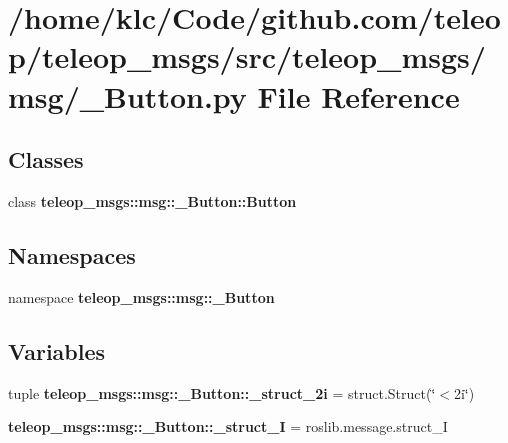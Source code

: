 \section{/home/klc/Code/github.com/teleop/teleop\_\-msgs/src/teleop\_\-msgs/msg/\_\-Button.py File Reference}
\label{__Button_8py}
\subsection*{Classes}
\begin{DoxyCompactItemize}
\item 
class {\bf teleop\_\-msgs::msg::\_\-Button::Button}
\end{DoxyCompactItemize}
\subsection*{Namespaces}
\begin{DoxyCompactItemize}
\item 
namespace {\bf teleop\_\-msgs::msg::\_\-Button}
\end{DoxyCompactItemize}
\subsection*{Variables}
\begin{DoxyCompactItemize}
\item 
tuple {\bf teleop\_\-msgs::msg::\_\-Button::\_\-struct\_\-2i} = struct.Struct(\char`\"{}$<$2i\char`\"{})
\item 
{\bf teleop\_\-msgs::msg::\_\-Button::\_\-struct\_\-I} = roslib.message.struct\_\-I
\end{DoxyCompactItemize}
